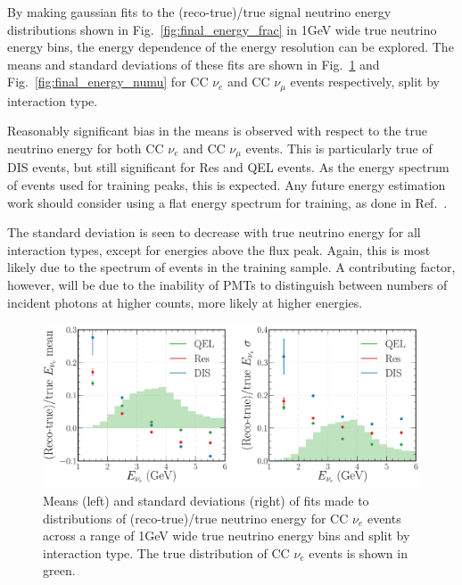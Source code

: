 By making gaussian fits to the (reco-true)/true signal neutrino energy distributions shown in
Fig.~\ref{fig:final_energy_frac} in \unit{1}{GeV} wide true neutrino energy bins, the energy
dependence of the energy resolution can be explored. The means and standard deviations of these
fits are shown in Fig.~\ref{fig:final_energy_nuel} and Fig.~\ref{fig:final_energy_numu} for CC
$\nu_{e}$ and CC $\nu_{\mu}$ events respectively, split by interaction type.

Reasonably significant bias in the means is observed with respect to the true neutrino energy for
both CC $\nu_{e}$ and CC $\nu_{\mu}$ events. This is particularly true of DIS events, but still
significant for Res and QEL events. As the energy spectrum of events used for training peaks, this
is expected. Any future energy estimation work should consider using a flat energy spectrum for
training, as done in Ref.~\cite{baldi2019}.

The standard deviation is seen to decrease with true neutrino energy for all interaction types,
except for energies above the flux peak. Again, this is most likely due to the spectrum of events
in the training sample. A contributing factor, however, will be due to the inability of PMTs to
distinguish between numbers of incident photons at higher counts, more likely at higher energies.

\begin{figure} %
    \includegraphics[width=\textwidth]{diagrams/7-results/final_energy_nuel.pdf}
    \caption[Means and standard deviations of fits to $\nu_{e}$ energy distributions]
    {Means (left) and standard deviations (right) of fits made to distributions of
        (reco-true)/true neutrino energy for CC $\nu_{e}$ events across a range of \unit{1}{GeV}
        wide true neutrino energy bins and split by interaction type. The true distribution of CC
        $\nu_{e}$ events is shown in green.}
    \label{fig:final_energy_nuel}
\end{figure}

